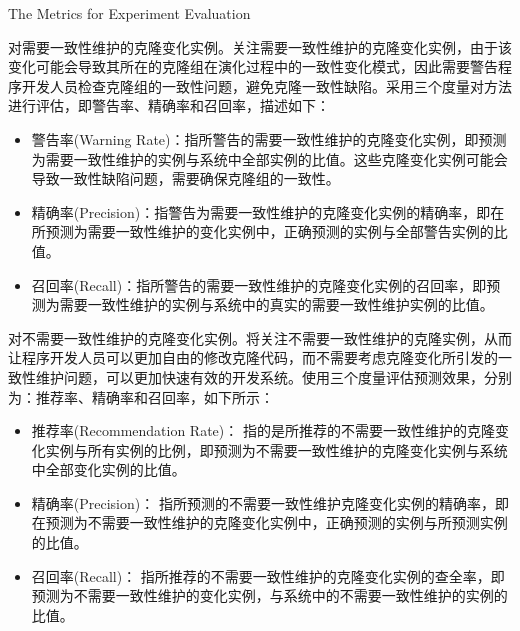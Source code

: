 
{The Metrics for Experiment Evaluation}
\label{ref-changingmetrics}

对需要一致性维护的克隆变化实例。关注需要一致性维护的克隆变化实例，由于该变化可能会导致其所在的克隆组在演化过程中的一致性变化模式，因此需要警告程序开发人员检查克隆组的一致性问题，避免克隆一致性缺陷。采用三个度量对方法进行评估，即警告率、精确率和召回率，描述如下：

\begin{itemize}
\item 
警告率(Warning Rate)：指所警告的需要一致性维护的克隆变化实例，即预测为需要一致性维护的实例与系统中全部实例的比值。这些克隆变化实例可能会导致一致性缺陷问题，需要确保克隆组的一致性。

\item 
精确率(Precision)：指警告为需要一致性维护的克隆变化实例的精确率，即在所预测为需要一致性维护的变化实例中，正确预测的实例与全部警告实例的比值。

\item 
召回率(Recall)：指所警告的需要一致性维护的克隆变化实例的召回率，即预测为需要一致性维护的实例与系统中的真实的需要一致性维护实例的比值。
\end{itemize}

对不需要一致性维护的克隆变化实例。将关注不需要一致性维护的克隆实例，从而让程序开发人员可以更加自由的修改克隆代码，而不需要考虑克隆变化所引发的一致性维护问题，可以更加快速有效的开发系统。使用三个度量评估预测效果，分别为：推荐率、精确率和召回率，如下所示：

\begin{itemize}
\item 
推荐率(Recommendation Rate)：
指的是所推荐的不需要一致性维护的克隆变化实例与所有实例的比例，即预测为不需要一致性维护的克隆变化实例与系统中全部变化实例的比值。
\item 
精确率(Precision)：
指所预测的不需要一致性维护克隆变化实例的精确率，即在预测为不需要一致性维护的克隆变化实例中，正确预测的实例与所预测实例的比值。
\item  
召回率(Recall)：
指所推荐的不需要一致性维护的克隆变化实例的查全率，即预测为不需要一致性维护的变化实例，与系统中的不需要一致性维护的实例的比值。
\end{itemize}

